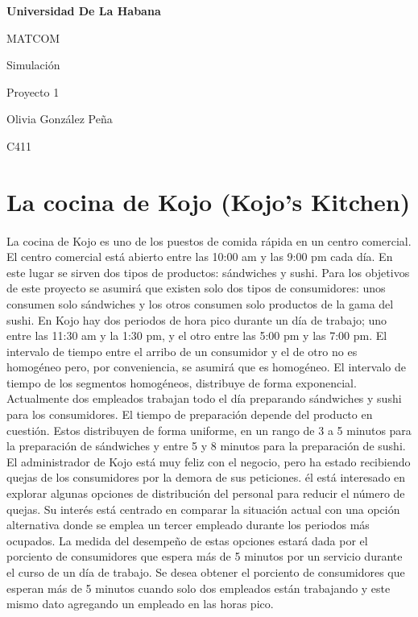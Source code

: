 \documentclass{article}
\begin{document}
\begin{titlepage}
  \centering
  {\bfseries\LARGE Universidad De La Habana \par}
  \vspace{1cm}
  {\Large MATCOM \par}
  \vspace{3cm}
  {\Huge Simulación \par}
  \vspace{1cm}
  {\Large Proyecto 1 }
  \vfill
  {\Large Olivia González Peña \par}
  {\Large C411 \par}

  \vfill
\end{titlepage}

\section {La cocina de Kojo (Kojo's Kitchen)}

\paragraph{}
La cocina de Kojo es uno de los puestos de comida rápida en un centro comercial. El centro comercial está abierto
entre las 10:00 am y las 9:00 pm cada día. En este lugar se sirven dos tipos de productos: sándwiches y sushi.
Para los objetivos de este proyecto se asumirá que existen solo dos tipos de consumidores: unos consumen solo
sándwiches y los otros consumen solo productos de la gama del sushi. En Kojo hay dos periodos de hora pico durante 
un día de trabajo; uno entre las 11:30 am y la 1:30 pm, y el otro entre las 5:00 pm y las 7:00 pm. El intervalo 
de tiempo entre el arribo de un consumidor y el de otro no es homogéneo pero, por conveniencia, se asumirá que es 
homogéneo. El intervalo de tiempo de los segmentos homogéneos, distribuye de forma exponencial. Actualmente dos 
empleados trabajan todo el día preparando sándwiches y sushi para los consumidores. El tiempo de preparación depende 
del producto en cuestión. Estos distribuyen de forma uniforme, en un rango de 3 a 5 minutos para la preparación de 
sándwiches y entre 5 y 8 minutos para la preparación de sushi. El administrador de Kojo está muy feliz con el 
negocio, pero ha estado recibiendo quejas de los consumidores por la demora de sus peticiones. él está interesado 
en explorar algunas opciones de distribución del personal para reducir el número de quejas. Su interés está centrado 
en comparar la situación actual con una opción alternativa donde se emplea un tercer empleado durante los periodos 
más ocupados. La medida del desempeño de estas opciones estará dada por el porciento de consumidores que espera más 
de 5 minutos por un servicio durante el curso de un día de trabajo. Se desea obtener el porciento de consumidores 
que esperan más de 5 minutos cuando solo dos empleados están trabajando y este mismo dato agregando un empleado en 
las horas pico.
\end{document}
